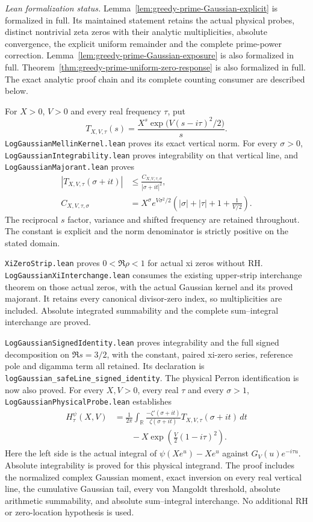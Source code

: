 \documentclass[11pt]{article}
\theoremstyle{definition}
\begin{document}
\emph{Lean formalization status.}
Lemma~\ref{lem:greedy-prime-Gaussian-explicit} is formalized in full.
Its maintained statement retains the actual physical probes, distinct
nontrivial zeta zeros with their analytic multiplicities, absolute
convergence, the explicit uniform remainder and the complete prime-power
correction. Lemma~\ref{lem:greedy-prime-Gaussian-exposure} is also formalized in full.
Theorem~\ref{thm:greedy-prime-uniform-zero-response} is also formalized in full.
The exact analytic proof chain and its complete counting consumer are described below.

For $X>0$, $V>0$ and every real frequency $\tau$, put
\[
 T_{X,V,\tau}(s)=
       \frac{X^s\exp\bigl(V(s-i\tau)^2/2\bigr)}s .
\]
\texttt{LogGaussianMellinKernel.lean} proves its exact vertical norm.
For every $\sigma>0$, \texttt{LogGaussianIntegrability.lean} proves
integrability on that vertical line, and
\texttt{LogGaussianMajorant.lean} proves
\[
 \begin{aligned}
 |T_{X,V,\tau}(\sigma+it)|
       &\le\frac{C_{X,V,\tau,\sigma}}{|\sigma+it|^2},\\
 C_{X,V,\tau,\sigma}
       &=X^\sigma e^{V\sigma^2/2}
      \left(|\sigma|+|\tau|+1+\frac1{V/2}\right).
 \end{aligned}
\]
The reciprocal $s$ factor, variance and shifted frequency are retained
throughout. The constant is explicit and the norm denominator is
strictly positive on the stated domain.

\texttt{XiZeroStrip.lean} proves $0<\Re\rho<1$ for actual xi zeros
without RH. \texttt{LogGaussianXiInterchange.lean} consumes the
existing upper-strip interchange theorem on those actual zeros,
with the actual Gaussian kernel and its proved majorant.
It retains every canonical divisor-zero index, so multiplicities
are included. Absolute integrated summability and the complete
sum--integral interchange are proved.

\texttt{LogGaussianSignedIdentity.lean} proves integrability and the
full signed decomposition on $\Re s=3/2$, with the constant,
paired xi-zero series, reference pole and digamma term all retained.
Its declaration is
\texttt{logGaussian\_\allowbreak safeLine\_\allowbreak signed\_\allowbreak identity}.
The physical Perron identification is now also proved.
For every $X,V>0$, every real $\tau$ and every $\sigma>1$,
\texttt{LogGaussianPhysicalProbe.lean} establishes
\[
 \begin{aligned}
 H_\tau^\psi(X,V)
   &=\frac1{2\pi}\int_{\mathbb R}
       \frac{-\zeta'(\sigma+it)}{\zeta(\sigma+it)}
                        T_{X,V,\tau}(\sigma+it)\,dt\\
   &\qquad{}-X\exp\!\left(\frac V2(1-i\tau)^2\right).
 \end{aligned}
\]
Here the left side is the actual integral of
$\psi(Xe^u)-Xe^u$ against $G_V(u)e^{-i\tau u}$.
Absolute integrability is proved for this physical integrand.
The proof includes the normalized complex Gaussian moment,
exact inversion on every real vertical line, the cumulative Gaussian
tail, every von Mangoldt threshold, absolute arithmetic summability,
and absolute sum--integral interchange.
No additional RH or zero-location hypothesis is used.
\end{document}
